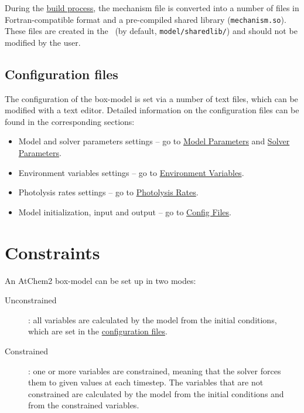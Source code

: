 During the \hyperref[subsec:build-process]{build process}, the mechanism file is converted into
a number of files in Fortran-compatible format and a pre-compiled shared library
(\texttt{mechanism.so}). These files are created in the \sharedir\ (by default,
\texttt{model/sharedlib/}) and should not be modified by the user.

\subsection{Configuration files} \label{subsec:configuration-files}

The configuration of the box-model is set via a number of text files, which can be modified
with a text editor. Detailed information on the configuration files can be found in the
corresponding sections:

\begin{itemize}
\item Model and solver parameters settings -- go to \hyperref[sec:model-parameters]{Model
    Parameters} and \hyperref[sec:solver-parameters]{Solver Parameters}.
\item Environment variables settings -- go to \hyperref[sec:environment-variables]{Environment
    Variables}.
\item Photolysis rates settings -- go to \hyperref[sec:photolysis-rates]{Photolysis Rates}.
\item Model initialization, input and output -- go to \hyperref[sec:configuration-files]{Config
    Files}.
\end{itemize}

\section{Constraints} \label{sec:constraints}

An AtChem2 box-model can be set up in two modes:

\begin{description}
\item[Unconstrained]: all variables are calculated by the model from the initial conditions,
  which are set in the \hyperref[subsec:configuration-files]{configuration files}.
\item[Constrained]: one or more variables are constrained, meaning that the solver forces them
  to given values at each timestep. The variables that are not constrained are calculated by
  the model from the initial conditions and from the constrained variables.
\end{description}

